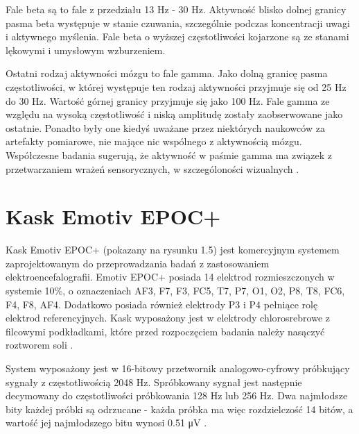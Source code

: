 \documentclass[notitlepage]{report}
\begin{document}
Fale beta są to fale z przedziału 13 Hz - 30 Hz. Aktywność blisko dolnej granicy pasma beta występuje w stanie czuwania, szczególnie podczas koncentracji uwagi i aktywnego myślenia. Fale beta o wyższej częstotliwości kojarzone są ze stanami lękowymi i umysłowym wzburzeniem. 

Ostatni rodzaj aktywności mózgu to fale gamma. Jako dolną granicę pasma częstotliwości, w której występuje ten rodzaj aktywności przyjmuje się od 25 Hz do 30 Hz. Wartość górnej granicy przyjmuje się jako 100 Hz. Fale gamma ze względu na wysoką częstotliwość i niską amplitudę zostały zaobserwowane jako ostatnie. Ponadto były one kiedyś uważane przez niektórych naukowców za artefakty pomiarowe, nie mające nic wspólnego z aktywnością mózgu. Współczesne badania sugerują, że aktywność w paśmie gamma ma związek z przetwarzaniem wrażeń sensorycznych, w szczególoności wizualnych \cite{swettenham} \cite{jia}.

\section{Kask Emotiv EPOC+}
Kask Emotiv EPOC+ (pokazany na rysunku 1.5) jest komercyjnym systemem zaprojektowanym do przeprowadzania badań z zastosowaniem elektroencefalografii. Emotiv EPOC+ posiada 14 elektrod rozmieszczonych w systemie 10\%, o oznaczeniach AF3, F7, F3, FC5, T7, P7, O1, O2, P8, T8, FC6, F4, F8, AF4. Dodatkowo posiada również elektrody P3 i P4 pełniące rolę elektrod referencyjnych. Kask wyposażony jest w elektrody chlorosrebrowe z filcowymi podkładkami, które przed rozpoczęciem badania należy nasączyć roztworem soli \cite{emotiv2}.

System wyposażony jest w 16-bitowy przetwornik analogowo-cyfrowy próbkujący sygnały z częstotliwością 2048 Hz. Spróbkowany sygnał jest następnie decymowany do częstotliwości próbkowania 128 Hz lub 256 Hz. Dwa najmłodsze bity każdej próbki są odrzucane - każda próbka ma więc rozdzielczość 14 bitów, a wartość jej najmłodszego bitu wynosi 0.51 \si{\micro\volt} \cite{emotiv} \cite{emotiv2}. 
\end{document}
